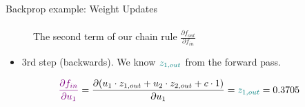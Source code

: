 \begin{vbframe}{Backprop example: Weight Updates}
\begin{eqnarray*}
    \end{eqnarray*}
      \vspace{-0.5cm}
    \begin{figure}
      \centering
        \caption{The second term of our chain rule $\frac{\partial f_{out}}{\partial f_{in}}$}
    \end{figure}
\framebreak
  \begin{itemize}
    \item 3rd step (backwards).  We know $\textcolor{teal}{z_{1, out}}$ from the forward pass.
  \end{itemize}
    \begin{eqnarray*}
      \textcolor{violet}{\frac{\partial f_{in}}{\partial u_1}} = \frac{\partial (u_1 \cdot z_{1,out} + u_2 \cdot z_{2,out} + c \cdot 1)}{\partial u_1} = \textcolor{teal}{z_{1, out}} = \num[round-mode=places,round-precision=4]{0.3705169}
    \end{eqnarray*}
    \begin{figure}
      \centering

\end{figure}
\end{vbframe}
